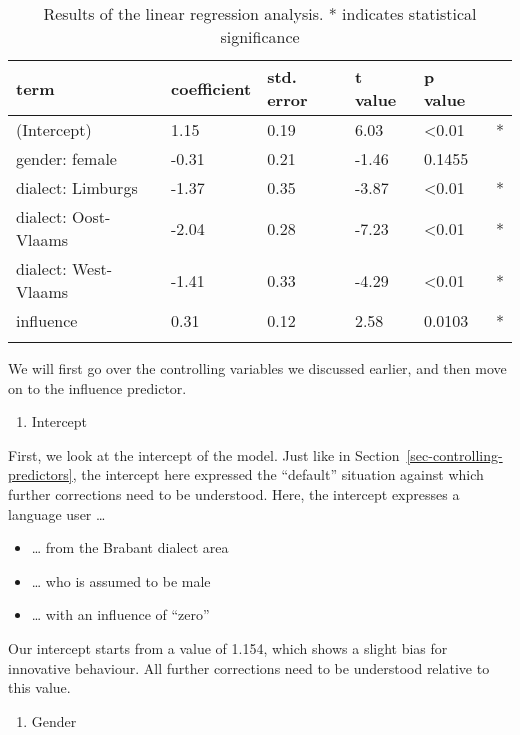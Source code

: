 \documentclass[
  letterpaper,
  DIV=11,
  numbers=noendperiod,
  oneside]{scrartcl}
\providecommand{\tightlist}{%
  \setlength{\itemsep}{0pt}\setlength{\parskip}{0pt}}\usepackage{longtable,booktabs,array}
\begin{document}
\begin{longtable}[]{@{}llllll@{}}

\toprule\noalign{}
term & coefficient & std. error & t value & p value & \\
\midrule\noalign{}
\endhead
\bottomrule\noalign{}
\endlastfoot
(Intercept) & 1.15 & 0.19 & 6.03 & \textless0.01 & * \\
gender: female & -0.31 & 0.21 & -1.46 & 0.1455 & \\
dialect: Limburgs & -1.37 & 0.35 & -3.87 & \textless0.01 & * \\
dialect: Oost-Vlaams & -2.04 & 0.28 & -7.23 & \textless0.01 & * \\
dialect: West-Vlaams & -1.41 & 0.33 & -4.29 & \textless0.01 & * \\
influence & 0.31 & 0.12 & 2.58 & 0.0103 & * \\


\caption{\label{tbl-linear-predictors}Results of the linear regression
analysis. * indicates statistical significance}

\tabularnewline
\end{longtable}

We will first go over the controlling variables we discussed earlier,
and then move on to the influence predictor.

\begin{enumerate}
\def\labelenumi{\arabic{enumi}.}
\tightlist
\item
  Intercept
\end{enumerate}

First, we look at the intercept of the model. Just like in
Section~\ref{sec-controlling-predictors}, the intercept here expressed
the ``default'' situation against which further corrections need to be
understood. Here, the intercept expresses a language user \ldots{}

\begin{itemize}
\tightlist
\item
  \ldots{} from the Brabant dialect area
\item
  \ldots{} who is assumed to be male
\item
  \ldots{} with an influence of ``zero''
\end{itemize}

Our intercept starts from a value of 1.154, which shows a slight bias
for innovative behaviour. All further corrections need to be understood
relative to this value.

\begin{enumerate}
\def\labelenumi{\arabic{enumi}.}
\setcounter{enumi}{1}
\tightlist
\item
  Gender
\end{enumerate}
\end{document}
